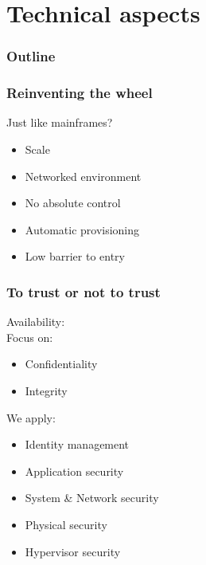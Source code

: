 \documentclass{beamer}
\begin{document}
\section{Technical aspects}

\begin{frame}
  \frametitle{Outline}
\end{frame}

\begin{frame}
    \frametitle{Reinventing the wheel}
    Just like mainframes?
    \begin{itemize}
    \item Scale
    \item Networked environment
    \item No absolute control
    \item Automatic provisioning
    \item Low barrier to entry
    \end{itemize}
\end{frame}

\begin{frame}
    \frametitle{To trust or not to trust}

    Availability: \checkmark \\
    Focus on:
    \begin{itemize}
      \item Confidentiality
      \item Integrity
    \end{itemize}
    We apply:
    \begin{itemize} %
      \item Identity management
      \item Application security
      \item System \& Network security
      \item Physical security
      \item Hypervisor security %
    \end{itemize}
\end{frame}
\end{document}

